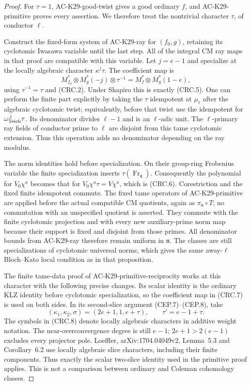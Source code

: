 \begin{proof}
For $\tau=1$, AC-K29-good-twist gives a good ordinary
$f$, and AC-K29-primitive proves every assertion.  We
therefore treat the nontrivial character $\tau$, of
conductor $\ell$.

Construct the fixed-form system of AC-K29-ray for
$(f_0,g)$, retaining its cyclotomic Iwasawa variable
until the last step.  All of the integral CM ray maps
in that proof are compatible with this variable.
Let $j=e-1$ and specialize at the locally algebraic
character $\kappa^j\tau$.  The coefficient map is
\[
 M_{f_0}^*\otimes M_g^*(-j)\otimes\tau^{-1}
       =M_f^*\otimes M_g^*(1-e),                         \tag{CRC.7}
\]
using $\tau^{-1}=\tau$ and (CRC.2).
Under Shapiro this is exactly (CRC.5).
One can perform the finite part explicitly by taking
the $\tau$ idempotent at $\mu_\ell$ after the
algebraic cyclotomic twist; equivalently, before that
twist use the idempotent for
$\omega_{\rm Teich}^{\,j}\tau$.  Its denominator divides $\ell-1$
and is an $\ell$-adic unit.  The $\ell$-primary ray
fields of conductor prime to $\ell$ are disjoint from
this tame cyclotomic extension.  Thus this operation
adds no denominator depending on the ray modulus.

The norm identities hold before specialization.
On their group-ring Frobenius variable the finite
specialization inserts $\tau(\operatorname{Fr}_{\mathfrak q})$.
Consequently the polynomial for $V_0\chi^a$ becomes
that for $V_0\chi^a\tau=V\chi^a$, which is (CRC.6).
Corestriction and the fixed finite idempotent commute.
The fixed tame operators of AC-K29-primitive are
applied before the actual compatible CM quotients,
again as $\pi_{\mathfrak n}\circ T$; no commutation
with an unspecified quotient is asserted.
They commute with the finite cyclotomic projection
and with every new auxiliary-prime norm map because
their support is fixed and disjoint from those primes.
All denominator bounds from AC-K29-ray therefore
remain uniform in $\mathfrak n$.
The classes are still specializations of cyclotomic
universal norms, which gives the same away-$\ell$
Bloch--Kato local condition as in that proposition.

The finite tame-data proof of AC-K29-primitive-reciprocity
works at this character with the following precise
changes.  Its scalar identity is the ordinary KLZ
identity before cyclotomic specialization, so the
coefficient map in (CRC.7) is used on both sides.
In its second-slice argument (CEP.7)--(CEP.8), take
\[
 (\kappa_1,\kappa_2,\sigma)=(2e+1,1,e+\tau),
 \qquad \tau'=e-1+\tau .                                 \tag{CRC.8}
\]
The symbols in (CRC.8) denote locally algebraic
characters in additive weight notation.  The
near-overconvergence degree is still $e-1$;
$2e+1>2(e-1)$ excludes every projector pole.
Loeffler, arXiv:1704.04049v2, Lemma~5.3 and
Corollary~6.2 use locally algebraic slice characters,
including their finite components.  Thus exactly
the scalar two-slice identity used in the primitive
proof applies.  This is not a comparison between
ordinary and Coleman cohomology classes.


\end{proof}
